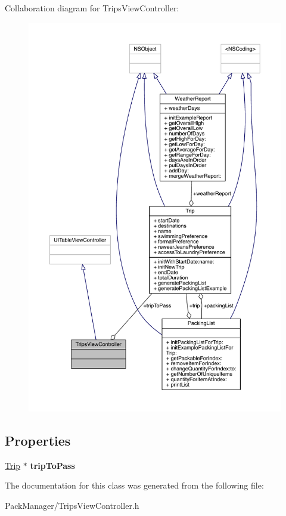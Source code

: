 Collaboration diagram for Trips\-View\-Controller\-:
\nopagebreak
\begin{figure}[H]
\begin{center}
\leavevmode
\includegraphics[width=350pt]{interface_trips_view_controller__coll__graph}
\end{center}
\end{figure}
\subsection*{Properties}
\begin{DoxyCompactItemize}
\item 
\hypertarget{interface_trips_view_controller_aefdf3056f500f9c958e6d42ae444bb31}{\hyperlink{interface_trip}{Trip} $\ast$ {\bfseries trip\-To\-Pass}}\label{interface_trips_view_controller_aefdf3056f500f9c958e6d42ae444bb31}

\end{DoxyCompactItemize}


The documentation for this class was generated from the following file\-:\begin{DoxyCompactItemize}
\item 
Pack\-Manager/Trips\-View\-Controller.\-h\end{DoxyCompactItemize}
